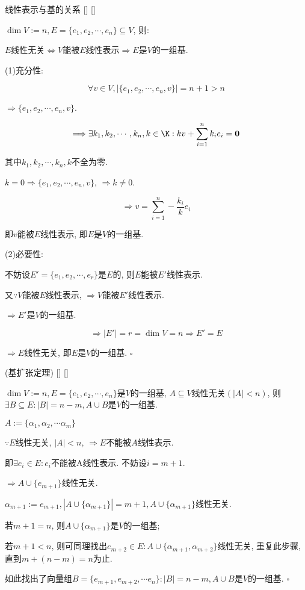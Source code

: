 \documentclass[UTF8]{ctexart}
\begin{document}
		\begin{ppt}
			[]
			{线性表示与基的关系}
			[]
			[]

			$\dim V:=n, E=\{e_{1},e_{2},\cdots,e_{n}\}\subseteq V$, 则: 
			
			$E$线性无关$\Longleftrightarrow V$能被$E$线性表示$\Longrightarrow E$是$V$的一组基. 
		\end{ppt}
		\begin{prf}
			
			(1)充分性: 
			
			$$\forall v\in V, |\{e_{1},e_{2},\cdots,e_{n}, v\}|=n+1>n$$
			
			$\Longrightarrow \{e_{1},e_{2},\cdots,e_{n}, v\}$. 
			
			$$\Longrightarrow \exists k_{1},k_{2},\cdots,k_{n},k\in\K: kv+\sum_{i=1}^{n}k_{i}e_{i}=\mathbf{0}$$
			
			其中$k_{1},k_{2},\cdots,k_{n},k$不全为零. 
			
			$k=0\Longrightarrow\{e_{1},e_{2},\cdots,e_{n}, v\}$, $\Longrightarrow k\neq 0$. 
			
			$$\Longrightarrow v=\sum_{i=1}^{n}-\frac{k_{i}}{k}e_{i}$$
			
			即$v$能被$E$线性表示, 即$E$是$V$的一组基. 
			
			(2)必要性: 
			
			不妨设$E'=\{e_{1},e_{2},\cdots,e_{r}\}$是$E$的, 则$E$能被$E'$线性表示. 
			
			又$\because V$能被$E$线性表示, $\Longrightarrow V$能被$E'$线性表示. 
			
			$\Longrightarrow E'$是$V$的一组基. 
			
			$$\Longrightarrow |E'|=r=\dim V=n\Longrightarrow E'=E$$
			
			$\Longrightarrow E$线性无关, 即$E$是$V$的一组基. $\square$
		\end{prf}
		\begin{thm}
			[]
			{(基扩张定理)}
			[]
			[]

            $\dim V:=n, E=\{e_{1},e_{2},\cdots, e_{n}\}$是$V$的一组基, $A\subseteq V$线性无关$(|A|<n)$, 则$\exists B\subseteq E: |B|=n-m, A\cup B$是$V$的一组基. 
		\end{thm}
		\begin{prf}
			
			$A:=\{\alpha_{1},\alpha_{2},\cdots \alpha_{m}\}$
			
			$\because E$线性无关, $|A|<n$, $\Longrightarrow E$不能被$A$线性表示. 
			
			即$\exists e_{i}\in E: e_{i}$不能被{A}线性表示. 不妨设$i=m+1$. 
			
			$\Longrightarrow A\cup \{e_{m+1}\}$线性无关. 
			
			$\alpha_{m+1}:=e_{m+1}, |A\cup\{\alpha_{m+1}\}|=m+1, A\cup\{\alpha_{m+1}\}$线性无关. 
			
			若$m+1=n$, 则$A\cup\{\alpha_{m+1}\}$是$V$的一组基; 
			
			若$m+1<n$, 则可同理找出$e_{m+2}\in E: A\cup\{\alpha_{m+1}, \alpha_{m+2}\}$线性无关, 重复此步骤, 直到$m+(n-m)=n$为止. 
			
			如此找出了向量组$B=\{e_{m+1},e_{m+2},\cdots e_{n}\}: |B|=n-m, A\cup B$是$V$的一组基. $\square$
		\end{prf}
		
\end{document}
